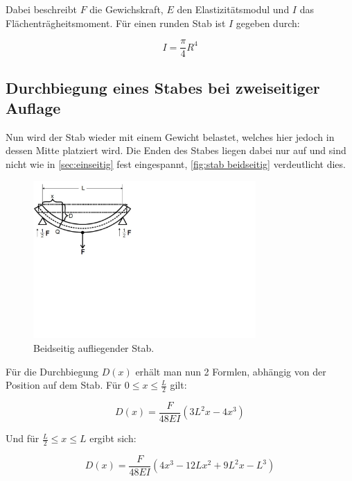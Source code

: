 Dabei beschreibt $F$ die Gewichskraft, $E$ den Elastizitätsmodul und $I$ das Flächenträgheitsmoment.
Für einen runden Stab ist $I$ gegeben durch:

\begin{equation}
    I=\frac{\pi}{4}R^{4}
    \label{eq:Flächenträgheitsmoment rund}
\end{equation}

\subsection{Durchbiegung eines Stabes bei zweiseitiger Auflage}
\label{sec:zweiseitig}

Nun wird der Stab wieder mit einem Gewicht belastet, welches hier jedoch in dessen Mitte platziert wird.
Die Enden des Stabes liegen dabei nur auf und sind nicht wie in \autoref{sec:einseitig} fest eingespannt,
\autoref{fig:stab beidseitig} verdeutlicht dies.

\begin{figure} [H]
    \centering
    \includegraphics[height=6cm]{content/Abbildungen/stab_beidseitig.pdf}
    \caption{Beidseitig aufliegender Stab. \cite{v103}}
    \label{fig:stab beidseitig}
\end{figure}

Für die Durchbiegung $D(x)$ erhält man nun 2 Formlen, abhängig von der Position auf dem Stab.
Für $0\leq x\leq \frac{L}{2}$ gilt:

\begin{equation}
    D(x)=\frac{F}{48EI}(3L^{2}x-4x^{3})
    \label{eq:Durchbiegung beidseitig 1}
\end{equation}

Und für $\frac{L}{2}\leq x\leq L$ ergibt sich:

\begin{equation}
    D(x)=\frac{F}{48EI}(4x^{3}-12Lx^{2}+9L^{2}x-L^{3})
    \label{eq:Durchbiegung beidseitig 2}
\end{equation}

